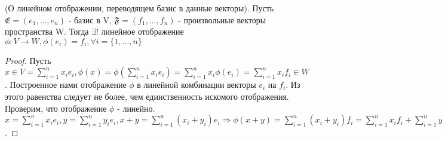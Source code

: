 \begin{theorem}
	(О линейном отображении, переводящем базис в данные векторы). 
	Пусть \(\mathfrak{E} = (e_1, \ldots, e_n)\) - базис в V, \(\mathfrak{F} = (f_1, \ldots, f_n)\) - произвольные векторы пространства W. Тогда \(\exists !\) линейное отображение \(\phi:V\to W, \phi(e_i) = f_i, \forall i = \{1,\ldots, n\}\)
\end{theorem}
\begin{proof}
	Пусть \(x\in V = \sum_{i=1}^{n}x_ie_i, \phi(x) = \phi(\sum_{i=1}^{n}x_ie_i)=\sum_{i=1}^{n}x_i\phi(e_i) = \sum_{i=1}^{n}x_if_i\in W\). Построенное нами отображение $\phi$ в линейной комбинации векторы \(e_i\) на \(f_i\). Из этого равенства следует не более, чем единственность искомого отображения. Проверим, что отображение $\phi$ - линейно. \(x = \sum_{i=1}^{n}x_ie_i, y = \sum_{i=1}^{n}y_ie_i, x+y = \sum_{i=1}^{n}(x_i+y_i)e_i\Longrightarrow \phi(x+y) = \sum_{i=1}^{n}(x_i+y_i)f_i = \sum_{i=1}^{n}x_if_i + \sum_{i=1}^{n}y_if_i = \phi(x) + \phi(y), \phi(\lambda x) = \phi(\sum_{i=1}^{n}\lambda_ix_ie_i) = \sum_{i=1}^{n}\lambda_ix_if_i = \lambda \phi(x)\).
\end{proof}

